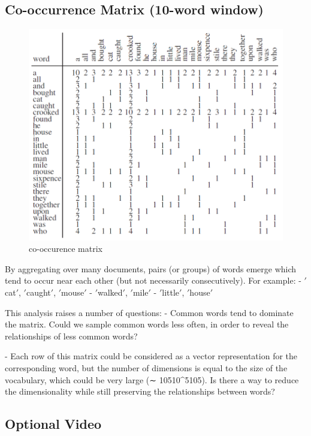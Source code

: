 \documentclass[11pt]{article}
\begin{document}
\subsection{Co-occurrence Matrix (10-word window)}\label{subsec:co-occurrence-matrix-(10-word-window)}
\begin{figure}[H]
    \centering
    \includegraphics{../out/images/co-occurence-matrix}
    \caption[co-occurence matrix]{co-occurence matrix}
    \label{fig:co-occurence matrix}
\end{figure}
By aggregating over many documents, pairs (or groups) of words emerge which tend to occur near each other (but not necessarily consecutively).
For example:
- \('\)cat\('\), \('\)caught\('\), \('\)mouse\('\)
- \('\)walked\('\), \('\)mile\('\)
- \('\)little\('\), \('\)house\('\)

This analysis raises a number of questions:
- Common words tend to dominate the matrix.
Could we sample common words less often, in order to reveal the relationships of less common words?

- Each row of this matrix could be considered as a vector representation for the corresponding word, but the number of dimensions is equal to the size of the vocabulary, which could be very large (∼ 10510^5105).
Is there a way to reduce the dimensionality while still preserving the relationships between words?

\subsection{Optional Video}\label{subsec:optional-video}
\end{document}
